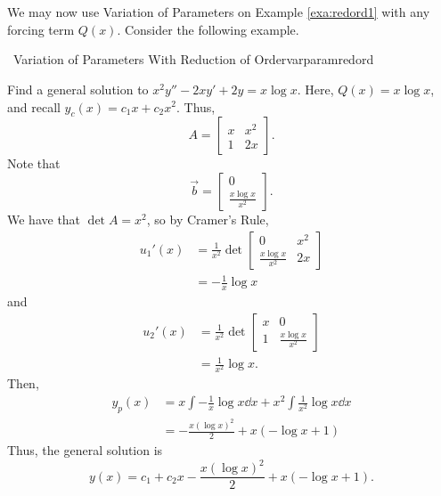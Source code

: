         \pagebreak
        \vphantom
        \\
        \\
        We may now use Variation of Parameters on Example \ref{exa:redord1} with any forcing term \(Q(x)\). Consider the following example.
        \begin{example}{\Difficulty\,\Difficulty\,\,Variation of Parameters With Reduction of Order}{varparamredord}

            Find a general solution to \(x^2y''-2xy'+2y=x\log x\). Here, \(Q(x)=x\log x\), and recall \(y_c(x)=c_1x+c_2x^2\). Thus,
            \begin{equation*}
                A=\begin{bmatrix}
                    x & x^2 \\
                    1 & 2x
                \end{bmatrix}.
            \end{equation*}
            Note that
            \begin{equation*}
                \vec{b}=\begin{bmatrix} 0 \\ \frac{x\log x}{x^2} \end{bmatrix}.
            \end{equation*}
            We have that \(\det A=x^2\), so by Cramer's Rule,
            \begin{align*}
                u_1'(x)&=\frac{1}{x^2}\det\begin{bmatrix} 0 & x^2 \\ \frac{x\log x}{x^2} & 2x \end{bmatrix} \\
                &=-\frac{1}{x}\log x
            \end{align*}
            and
            \begin{align*}
                u_2'(x)&=\frac{1}{x^2}\det\begin{bmatrix} x & 0 \\ 1 & \frac{x\log x}{x^2} \end{bmatrix} \\
                &=\frac{1}{x^2}\log x.
            \end{align*}
            Then,
            \begin{align*}
                y_p(x)&=x\int -\frac{1}{x}\log x \dd x+x^2\int \frac{1}{x^2}\log x\dd x \\
                &=-\frac{x(\log x)^2}{2}+x(-\log x+1)
            \end{align*}
            Thus, the general solution is
            \begin{equation*}
                y(x)=c_1+c_2x-\frac{x(\log x)^2}{2}+x(-\log x+1).
            \end{equation*}
            
        \end{example}

